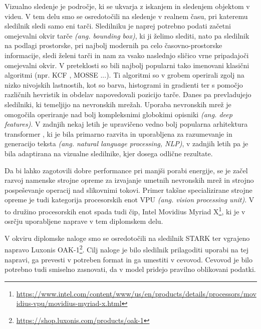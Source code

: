 \documentclass[a4paper,12pt,openright]{book}
\begin{document}
Vizualno sledenje je področje, ki se ukvarja z iskanjem in sledenjem objektom v videu. V tem delu smo se osredotočili na sledenje v realnem času, pri kateremu sledilnik sledi samo eni tarči. Sledilniku je naprej potrebno podati začetni omejevalni okvir tarče \emph{(ang. bounding box)}, ki ji želimo slediti, nato pa sledilnik na podlagi prostorske, pri najbolj modernih pa celo časovno-prostorske informacije, sledi želeni tarči in nam za vsako naslednjo sličico vrne pripadajoči omejevalni okvir. V preteklosti so bili najbolj popularni tako imenovani klasični algoritmi (npr. KCF \cite{kcf}, MOSSE \cite{mosse} ...). Ti algoritmi so v grobem operirali zgolj na nizko nivojskih lastnostih, kot so barva, histogrami in gradienti ter s pomočjo različnih hevristik in obdelav napovedovali pozicijo tarče. Danes pa prevladujejo sledilniki, ki temeljijo na nevronskih mrežah. Uporaba nevronskih mrež je omogočila operiranje nad bolj kompleksnimi globokimi opisniki \emph{(ang. deep features)}. V zadnjih nekaj letih je upravičeno vedno bolj popularna arhitektura transformer \cite{attention_is_all_you_need}, ki je bila primarno razvita in uporabljena za razumevanje in generacijo teksta \emph{(ang. natural language processing, NLP)}, v zadnjih letih pa je bila adaptirana na vizualne sledilnike, kjer dosega odlične rezultate.

Da bi lahko zagotovili dobre performance pri manjši porabi energije, se je začel razvoj namenske strojne opreme za izvajanje umetnih nevronskih mrež in strojno pospeševanje operacij nad slikovnimi tokovi. Primer takšne specializirane strojne opreme je tudi kategorija procesorskih enot VPU \emph{(ang. vision processing unit)}. V to družino procesorskih enot spada tudi čip, Intel Movidius Myriad X\footnote{\url{https://www.intel.com/content/www/us/en/products/details/processors/movidius-vpu/movidius-myriad-x.html}}, ki je v osrčju uporabljene naprave v tem diplomskem delu.

V okviru diplomske naloge smo se osredotočili na sledilnik STARK \cite{stark} ter vgrajeno napravo Luxonis OAK-1\footnote{\url{https://shop.luxonis.com/products/oak-1}}. Cilj naloge je bilo sledilnik prilagoditi uporabi na tej napravi, ga prevesti v potreben format in ga umestiti v cevovod. Cevovod je bilo potrebno tudi smiselno zasnovati, da v model pridejo pravilno oblikovani podatki.
\end{document}
